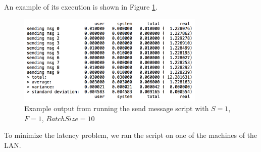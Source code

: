 An example of its execution is shown in Figure \ref{send-msg-output}.

\begin{figure}[htb]
	\centering
	\includegraphics[width=0.8\textwidth]{images/send-msg-output}
	\caption{Example output from running the send message script with $S = 1$, $F = 1$, $BatchSize = 10$}
	\label{send-msg-output}
\end{figure}

To minimize the latency problem, we ran the  script on one of the machines of the LAN.